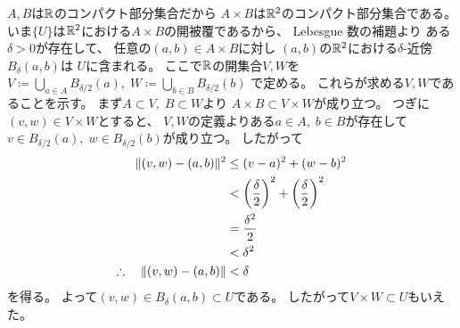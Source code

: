 \documentclass[report]{jlreq}
\begin{document}
\begin{answer}
    $A, B$は$\mathbb{R}$のコンパクト部分集合だから
    $A \times B$は$\mathbb{R}^2$のコンパクト部分集合である。
    いま$\{ U \}$は$\mathbb{R}^2$における$A \times B$の開被覆であるから、
    Lebesgue 数の補題より
    ある$\delta > 0$が存在して、
    任意の$(a, b) \in A \times B$に対し
    $(a, b)$の$\mathbb{R}^2$における$\delta$-近傍$B_\delta (a, b)$は
    $U$に含まれる。
    ここで$\mathbb{R}$の開集合$V, W$を
    $V \coloneqq \bigcup_{a \in A} B_{\delta / 2}(a), \;
        W \coloneqq \bigcup_{b \in B} B_{\delta / 2}(b)$
    で定める。
    これらが求める$V, W$であることを示す。
    まず$A \subset V, \; B \subset W$より
    $A \times B \subset V \times W$が成り立つ。
    つぎに$(v, w) \in V \times W$とすると、
    $V, W$の定義よりある$a \in A, \; b \in B$が存在して
    $v \in B_{\delta / 2}(a), \; w \in B_{\delta / 2}(b)$が成り立つ。
    したがって
    \begin{alignat}{1}
        \| (v, w) - (a, b) \|^2
            &\le (v - a)^2 + (w - b)^2 \\
            &< \left({\frac{\delta}{2}}\right)^2 + \left({\frac{\delta}{2}}\right)^2 \\
            &= \frac{\delta^2}{2} \\
            &< \delta^2 \\
        \therefore \quad \| (v, w) - (a, b) \|
            &< \delta
    \end{alignat}
    を得る。
    よって$(v, w) \in B_\delta (a, b) \subset U$である。
    したがって$V \times W \subset U$もいえた。
\end{answer}
\end{document}
